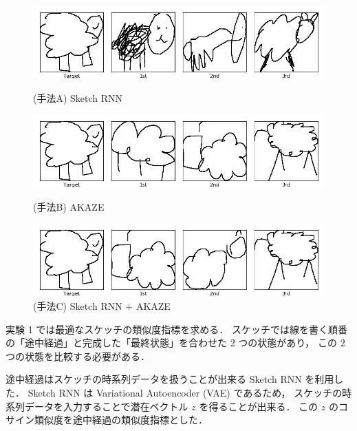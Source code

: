 \documentclass[twocolumn]{jarticle}     %
\begin{document}
\begin{figure}[tb]
 \begin{minipage}{1\hsize}
 	\begin{center}
 		\includegraphics[clip,width=120mm]{sketch_trained_sim_A_0.png}
 		\caption{(手法A) Sketch RNN}
 		\label{fig:exp1_a}
 	\end{center}
 \end{minipage}

  \begin{minipage}{1\hsize}
  	\begin{center}
  		\includegraphics[clip,width=120mm]{sketch_trained_sim_B_0.png}
  		\caption{(手法B) AKAZE}
  		\label{fig:exp1_b}
  	\end{center}
  \end{minipage}

   \begin{minipage}{1\hsize}
   	\begin{center}
   		\includegraphics[clip,width=120mm]{sketch_trained_sim_D_0.png}
   		\caption{(手法C) Sketch RNN + AKAZE}
   		\label{fig:exp1_c}
   	\end{center}
   \end{minipage}
\end{figure}

実験 1 では最適なスケッチの類似度指標を求める．
スケッチでは線を書く順番の「途中経過」と完成した「最終状態」を合わせた 2 つの状態があり，
この 2 つの状態を比較する必要がある．

途中経過はスケッチの時系列データを扱うことが出来る Sketch RNN を利用した．
Sketch RNN は Variational Autoencoder (VAE) であるため，
スケッチの時系列データを入力することで潜在ベクトル $z$ を得ることが出来る．
この $z$ のコサイン類似度を途中経過の類似度指標とした．
\end{document}
